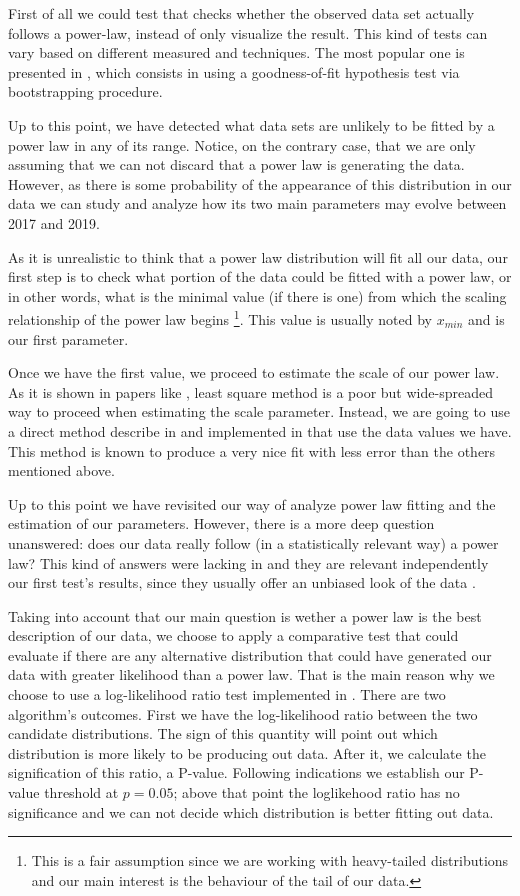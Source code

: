 \documentclass[conference]{IEEEtran}
\begin{document}
First of all we could test that checks whether the observed data set
actually follows a power-law, instead of only visualize the result.
This kind of tests can vary based on different measured and
techniques. The most popular one is presented in
\cite{clauset2009power}, which consists in using a goodness-of-fit
hypothesis test via bootstrapping procedure.


Up to this point, we have detected what data sets are unlikely to be
fitted by a power law in any of its range. Notice, on the contrary
case, that we are only assuming that we can not discard that a power
law is generating the data.  However, as there is some probability of
the appearance of this distribution in our data we can study and
analyze how its two main parameters may evolve between 2017 and 2019.

As it is unrealistic to think that a power law distribution will fit
all our data, our first step is to check what portion of the data
could be fitted with a power law, or in other words, what is the
minimal value (if there is one) from which the scaling relationship of
the power law begins \footnote{This is a fair assumption since we are
  working with heavy-tailed distributions and our main interest is the
  behaviour of the tail of our data.}.  This value is usually noted by
$x_{min}$ and is our first parameter.

Once we have the first value, we proceed to estimate the scale of our
power law.  As it is shown in papers like \cite{newman2005power,
  clauset2009power}, least square method is a poor but wide-spreaded
way to proceed when estimating the scale parameter. Instead, we are
going to use a direct method describe in \cite{clauset2009power} and
implemented in \cite{alstott2014powerlaw} that use the data values we
have. This method is known to produce a very nice fit with less error
than the others mentioned above.

Up to this point we have revisited our way of analyze power law
fitting and the estimation of our parameters. However, there is a more
deep question unanswered: does our data really follow (in a
statistically relevant way) a power law?  This kind of answers were
lacking in \cite{merelo2017self} and they are relevant independently
our first test's results, since they usually offer an unbiased look of
the data .

Taking into account that our main question is wether a power law is
the best description of our data, we choose to apply a comparative
test that could evaluate if there are any alternative distribution
that could have generated our data with greater likelihood than a
power law. That is the main reason why we choose to use a
log-likelihood ratio test implemented in \cite{alstott2014powerlaw}.
There are two algorithm's outcomes. First we have the log-likelihood
ratio between the two candidate distributions. The sign of this
quantity will point out which distribution is more likely to be
producing out data. After it, we calculate the signification of this
ratio, a P-value. Following \cite{alstott2014powerlaw} indications we
establish our P-value threshold at $p=0.05$; above that point the
loglikehood ratio has no significance and we can not decide which
distribution is better fitting out data.
\end{document}
